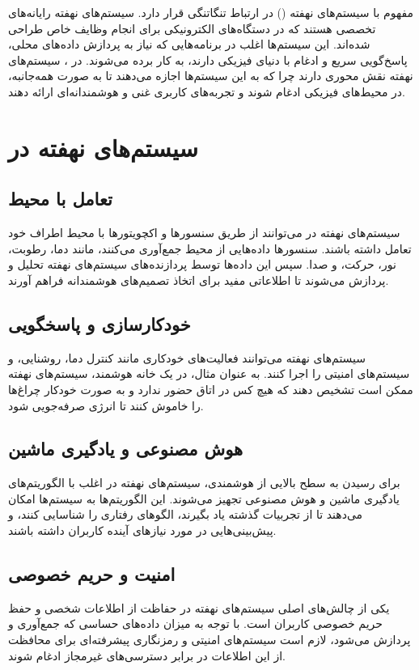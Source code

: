 مفهوم
\textbf{}
با سیستم‌های نهفته
(\textbf{})
در ارتباط تنگاتنگی قرار دارد. سیستم‌های نهفته رایانه‌های تخصصی هستند که در دستگاه‌های الکترونیکی برای انجام وظایف خاص طراحی شده‌اند. این سیستم‌ها اغلب در برنامه‌هایی که نیاز به پردازش داده‌های محلی، پاسخ‌گویی سریع و ادغام با دنیای فیزیکی دارند، به کار برده می‌شوند. در  ، سیستم‌های نهفته نقش محوری دارند چرا که به این سیستم‌ها اجازه می‌دهند تا به صورت همه‌جانبه، در محیط‌های فیزیکی ادغام شوند و تجربه‌های کاربری غنی و هوشمندانه‌ای ارائه دهند.

\section*{سیستم‌های نهفته در }

\subsection*{تعامل با محیط}
سیستم‌های نهفته در  می‌توانند از طریق سنسورها و اکچویتورها با محیط اطراف خود تعامل داشته باشند. سنسورها داده‌هایی از محیط جمع‌آوری می‌کنند، مانند دما، رطوبت، نور، حرکت، و صدا. سپس این داده‌ها توسط پردازنده‌های سیستم‌های نهفته تحلیل و پردازش می‌شوند تا اطلاعاتی مفید برای اتخاذ تصمیم‌های هوشمندانه فراهم آورند.

\subsection*{خودکارسازی و پاسخگویی}
سیستم‌های نهفته می‌توانند فعالیت‌های خودکاری مانند کنترل دما، روشنایی، و سیستم‌های امنیتی را اجرا کنند. به عنوان مثال، در یک خانه هوشمند، سیستم‌های نهفته ممکن است تشخیص دهند که هیچ کس در اتاق حضور ندارد و به صورت خودکار چراغ‌ها را خاموش کنند تا انرژی صرفه‌جویی شود.

\subsection*{هوش مصنوعی و یادگیری ماشین}
برای رسیدن به سطح بالایی از هوشمندی، سیستم‌های نهفته در  اغلب با الگوریتم‌های یادگیری ماشین و هوش مصنوعی تجهیز می‌شوند. این الگوریتم‌ها به سیستم‌ها امکان می‌دهند تا از تجربیات گذشته یاد بگیرند، الگوهای رفتاری را شناسایی کنند، و پیش‌بینی‌هایی در مورد نیازهای آینده کاربران داشته باشند.

\subsection*{امنیت و حریم خصوصی}
یکی از چالش‌های اصلی سیستم‌های نهفته در  حفاظت از اطلاعات شخصی و حفظ حریم خصوصی کاربران است. با توجه به میزان داده‌های حساسی که جمع‌آوری و پردازش می‌شود، لازم است سیستم‌های امنیتی و رمزنگاری پیشرفته‌ای برای محافظت از این اطلاعات در برابر دسترسی‌های غیرمجاز ادغام شوند.

